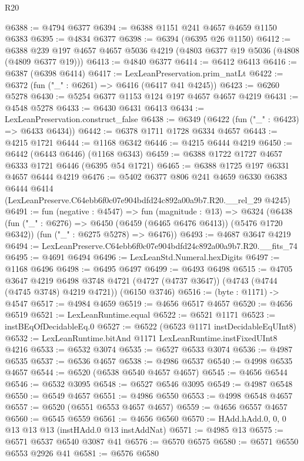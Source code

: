 \begin{lexlean}{R20}
\begin{coremodule}
@6388 := @4794 @6377
@6394 := @6388 @1151 @241 @4657 @4659 @1150 @6383
@6395 := @4834 @6377
@6398 := @6394 (@6395 @26 @1150)
@6412 := @6388 @239 @197 @4657 @4657 @5036 @4219 (@4803 @6377 @19 @5036 (@4808 (@4809 @6377 @19)))
@6413 := @4840 @6377
@6414 := @6412 @6413
@6416 := @6387 (@6398 @6414)
@6417 := LexLeanPreservation.prim_natLt
@6422 := @6372 (fun ("_" : @6261) => @6416 (@6417 @41 @4245))
@6423 := @6260 @5278
@6430 := @5254 @6377 @1153 @124 @197 @4657 @4657 @4219
@6431 := @4548 @5278
@6433 := @6430 @6431 @6413
@6434 := LexLeanPreservation.construct_false
@6438 := @6349 (@6422 (fun ("_" : @6423) => @6433 @6434))
@6442 := @6378 @1711 @1728 @6334 @4657
@6443 := @4215 @1721
@6444 := @1168 @6342
@6446 := @4215 @6444 @4219
@6450 := @6442 (@6443 @6446) (@1168 @6343)
@6459 := @6388 @1722 @1727 @4657 @6333 @1721 @6446 (@6395 @54 @1721)
@6465 := @6388 @1725 @197 @6331 @4657 @6444 @4219
@6476 := @5402
    @6377
    @806
    @241
    @4659
    @6330
    @6383
    @6444
    @6414
    (LexLeanPreserve.C64ebb6f0c07e904bdfd24c892a00a9b7.R20.__rel_29 @4245)
@6491 := fun (negative : @4547) =>
  fun (magnitude : @13) =>
  @6324
    (@6438
      (fun ("_" : @6276) => @6450 (@6459 (@6465 @6476 @6413)) (@5476 @1720 @6342))
      (fun ("_" : @6275 @5278) => @6476))
@6493 := @4687 @3647 @4219
@6494 := LexLeanPreserve.C64ebb6f0c07e904bdfd24c892a00a9b7.R20.__fits_74
@6495 := @4691 @6494
@6496 := LexLeanStd.Numeral.hexDigits
@6497 := @1168 @6496
@6498 := @6495 @6497
@6499 := @6493 @6498
@6515 := @4705
    @3647
    @4219
    @6498
    @3748
    @4721
    (@4727 (@4737 @3647))
    (@4743 (@4744 (@4745 @3748) @4219 @4721))
    (@6150 @3746)
@6516 := (byte : @1171) -> @4547
@6517 := @4984 @4659
@6519 := @4656 @6517 @4657
@6520 := @4656 @6519
@6521 := LexLeanRuntime.equal
@6522 := @6521 @1171
@6523 := instBEqOfDecidableEq.{0}
@6527 := @6522 (@6523 @1171 instDecidableEqUInt8)
@6532 := LexLeanRuntime.bitAnd @1171 LexLeanRuntime.instFixedUInt8 @4216
@6533 := @6532 @3074
@6535 := @6527 @6533 @3074
@6536 := @4987 @6535
@6537 := @6536 @4657
@6538 := @4986 @6537
@6540 := @4998 @6535 @4657
@6544 := @6520 (@6538 @6540 @4657 @4657)
@6545 := @4656 @6544
@6546 := @6532 @3095
@6548 := @6527 @6546 @3095
@6549 := @4987 @6548
@6550 := @6549 @4657
@6551 := @4986 @6550
@6553 := @4998 @6548 @4657
@6557 := @6520 (@6551 @6553 @4657 @4657)
@6559 := @4656 @6557 @4657
@6560 := @6545 @6559
@6561 := @4656 @6560
@6570 := HAdd.hAdd.{0, 0, 0} @13 @13 @13 (instHAdd.{0} @13 instAddNat)
@6571 := @4985 @13
@6575 := @6571 @6537 @6540 @3087 @41
@6576 := @6570 @6575
@6580 := @6571 @6550 @6553 @2926 @41
@6581 := @6576 @6580

\end{coremodule}
\end{lexlean}
